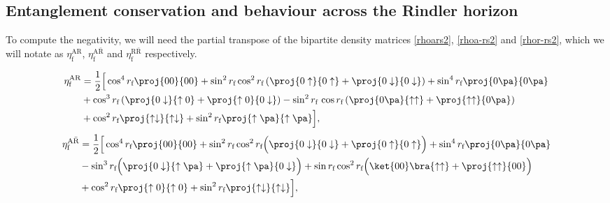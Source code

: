 \subsection{Entanglement conservation and behaviour across the Rindler horizon}\label{conservanet}

To compute the negativity, we will need the partial transpose of the bipartite density matrices \eqref{rhoars2}, \eqref{rhoa-rs2} and \eqref{rhor-rs2}, which we will notate as $\eta^\text{AR}_\text{f}$, $\eta^{\text{A}{\bar{\text{R}}}}_\text{f}$ and $\eta^{\text{R}{\bar{\text{R}}}}_\text{f}$  respectively.

\begin{align}\label{etaARd}
\nonumber\eta^\text{AR}_\text{f}&=\frac12\Big[\cos^4r_\text{f}\proj{00}{00}+\sin^2r_\text{f}\cos^2r_\text{f}\left(\proj{0\uparrow}{0\uparrow}+\proj{0\downarrow}{0\downarrow}\right)+\sin^4r_\text{f}\proj{0\pa}{0\pa}\\*
\nonumber&+\cos^3r_\text{f}\left(\proj{0\downarrow}{\uparrow0}+\proj{\uparrow0}{0\downarrow}\right)-\sin^2r_\text{f}\,\cos r_\text{f}\left(\proj{0\pa}{\uparrow\uparrow}+\proj{\uparrow\uparrow}{0\pa}\right)\\*
&+\cos^2r_\text{f}\proj{\uparrow\downarrow}{\uparrow\downarrow}+\sin^2r_\text{f}\proj{\uparrow\pa}{\uparrow\pa}\Big],
\end{align}
\begin{align}\label{etaAaRd}
\nonumber \eta^{\text{A}{\bar{\text{R}}}}_\text{f}&=\frac12\Big[\cos^4 r_\text{f} \proj{00}{00}+\sin^2 r_\text{f}\cos^2 r_\text{f}\Big(\proj{0\downarrow}{0\downarrow}+\proj{0\uparrow}{0\uparrow}\Big)+\sin^4 r_\text{f}\proj{0\pa}{0\pa} \nonumber\\*
& -\sin^3r_\text{f}\Big(\proj{0\downarrow}{\uparrow\pa}+\proj{\uparrow\pa}{0\downarrow}\Big)+\sin r_\text{f}\cos^2 r_\text{f}\nonumber\Big(\ket{00}\bra{\uparrow\uparrow}+\proj{\uparrow\uparrow}{00}\Big)\nonumber\\*
&+\cos^2 r_\text{f} \proj{\uparrow0}{\uparrow0}+\sin^2 r_\text{f}\proj{\uparrow\downarrow}{\uparrow\downarrow}\Big],
\end{align}
